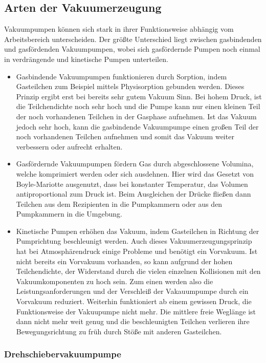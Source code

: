 	\subsection{Arten der Vakuumerzeugung}	
		
		\noindent
		Vakuumpumpen können sich stark in ihrer Funktionsweise abhängig vom Arbeitsbereich unterscheiden.
		Der größte Unterschied liegt zwischen gasbindenden und gasfördenden Vakuumpumpen, wobei sich gasfördernde Pumpen noch einmal in verdrängende und kinetische Pumpen unterteilen.
		\begin{itemize}
		\item
		Gasbindende Vakuumpumpen funktionieren durch Sorption, indem Gasteilchen zum Beispiel mittels Physisorption gebunden werden. 
		Dieses Prinzip ergibt erst bei bereits sehr gutem Vakuum Sinn. 
		Bei hohem Druck, ist die Teilchendichte noch sehr hoch und die Pumpe kann nur einen kleinen Teil der noch vorhandenen Teilchen in der Gasphase aufnehmen.
		Ist das Vakuum jedoch sehr hoch, kann die gasbindende Vakuumpumpe einen großen Teil der noch vorhandenen Teilchen aufnehmen und somit das Vakuum weiter verbessern oder aufrecht erhalten.
		\item
		Gasfördernde Vakuumpumpen fördern Gas durch abgeschlossene Volumina, welche komprimiert werden oder sich ausdehnen.
		Hier wird das Gesetzt von Boyle-Mariotte ausgenutzt, dass bei konstanter Temperatur, das Volumen antiproportional zum Druck ist.
		Beim Ausgleichen der Drücke fließen dann Teilchen aus dem Rezipienten in die Pumpkammern oder aus den Pumpkammern in die Umgebung. 
		\item
		Kinetische Pumpen erhöhen das Vakuum, indem Gasteilchen in Richtung der Pumprichtung beschleunigt werden.
		Auch dieses Vakuumerzeugungsprinzip hat bei Atmosphärendruck einige Probleme und benötigt ein Vorvakuum.
		Ist nicht bereits ein Vorvakuum vorhanden, so kann aufgrund der hohen Teilchendichte, der Widerstand durch die vielen einzelnen Kollisionen mit den Vakuumkomponenten zu hoch sein.
		Zum einen werden also die Leistungsanforderungen und der Verschleiß der Vakauumpumpe durch ein Vorvakuum reduziert.
		Weiterhin funktioniert ab einem gewissen Druck, die Funktionsweise der Vakuupumpe nicht mehr.
		Die mittlere freie Weglänge ist dann nicht mehr weit genug und die beschleunigten Teilchen verlieren ihre Bewegungsrichtung zu früh durch Stöße mit anderen Gasteilchen.
		\end{itemize}
		\subsubsection{Drehschiebervakuumpumpe} 
						
